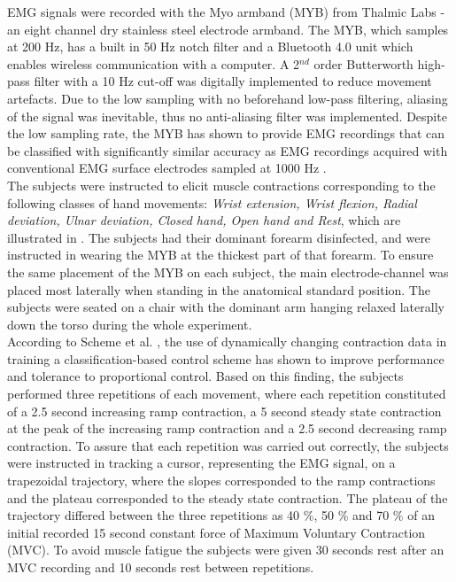 EMG signals were recorded with the Myo armband (MYB) from Thalmic Labs - an eight channel dry stainless steel electrode armband. The MYB, which samples at 200 Hz, has a built in 50 Hz notch filter and a Bluetooth 4.0 unit which enables wireless communication with a computer. A 2$^{nd}$ order Butterworth high-pass filter with a 10 Hz cut-off was digitally implemented to reduce movement artefacts. Due to the low sampling with no beforehand low-pass filtering, aliasing of the signal was inevitable, thus no anti-aliasing filter was implemented. Despite the low sampling rate, the MYB has shown to provide EMG recordings that can be classified with significantly similar accuracy as EMG recordings acquired with conventional EMG surface electrodes sampled at 1000 Hz \cite{Mendez2017}. \\
The subjects were instructed to elicit muscle contractions corresponding to the following classes of hand movements: \textit{Wrist extension, Wrist flexion, Radial deviation, Ulnar deviation, Closed hand, Open hand and Rest}, which are illustrated in . The subjects had their dominant forearm disinfected, and were instructed in wearing the MYB at the thickest part of that forearm. To ensure the same placement of the MYB on each subject, the main electrode-channel was placed most laterally when standing in the anatomical standard position. The subjects were seated on a chair with the dominant arm hanging relaxed laterally down the torso during the whole experiment. \\

According to Scheme et al. \cite{Scheme2015}, the use of dynamically changing contraction data in training a classification-based control scheme has shown to improve performance and tolerance to proportional control. Based on this finding, the subjects performed three repetitions of each movement, where each repetition constituted of a 2.5 second increasing ramp contraction, a 5 second steady state contraction at the peak of the increasing ramp contraction and a 2.5 second decreasing ramp contraction. To assure that each repetition was carried out correctly, the subjects were instructed in tracking a cursor, representing the EMG signal, on a trapezoidal trajectory, where the slopes corresponded to the ramp contractions and the plateau corresponded to the steady state contraction. The plateau of the trajectory differed between the three repetitions as 40 \%, 50 \% and 70 \% of an initial recorded 15 second constant force of Maximum Voluntary Contraction (MVC). To avoid muscle fatigue the subjects were given 30 seconds rest after an MVC recording and 10 seconds rest between repetitions. 

